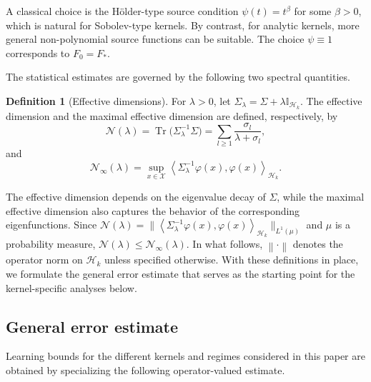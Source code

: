 \documentclass[11pt]{article}
\numberwithin{equation}{section}
\theoremstyle{plain}
\theoremstyle{definition}
\newtheorem{definition}[theorem]{Definition}
\theoremstyle{remark}
\newcommand{\X}{\mathcal{X}}
\newcommand{\Hs}{\mathcal{H}}
\newcommand{\I}{\mathbb{I}}
\newcommand{\norm}[1]{\left\lVert#1\right\rVert}
\newcommand{\innerpro}[1]{\left\langle#1\right\rangle}
\begin{document}
A classical choice is the Hölder-type source condition
$\psi(t)=t^{\beta}$ for some $\beta>0$, which is natural for Sobolev-type
kernels. By contrast, for analytic kernels, more general non-polynomial
source functions can be suitable. The choice $\psi\equiv1$
corresponds to $F_0=F_*$.

The statistical estimates are governed by the following two spectral
quantities.

\begin{definition}[Effective dimensions]
\label{def:effective_dimensions}
For $\lambda>0$, let
$\Sigma_\lambda=\Sigma+\lambda\I_{\Hs_k}$. The effective dimension and the
maximal effective dimension are defined, respectively, by
\begin{equation}
\label{eq:eff_dim_operator}
\mathcal{N}(\lambda)
=
\operatorname{Tr}\bigl(\Sigma_\lambda^{-1}\Sigma\bigr)
=
\sum_{l\geq1}\frac{\sigma_l}{\lambda+\sigma_l},
\end{equation}
and
\begin{equation}
\label{eq:max_eff_dim_operator}
\mathcal{N}_{\infty}(\lambda)
=
\sup_{x\in\X}
\innerpro{\Sigma_\lambda^{-1}\varphi(x),\varphi(x)}_{\Hs_k}.
\end{equation}
\end{definition}

The effective dimension depends on the eigenvalue decay of $\Sigma$, while the
maximal effective dimension also captures the behavior of the corresponding
eigenfunctions. Since $\mathcal{N}(\lambda)=\|\innerpro{\Sigma_\lambda^{-1}\varphi(x),\varphi(x)}_{\Hs_k}\|_{L^1(\mu)}$ and $\mu$ is a probability measure,
$\mathcal{N}(\lambda)\leq\mathcal{N}_{\infty}(\lambda)$.
In what follows, $\norm{\cdot}$ denotes the operator norm on $\Hs_k$ unless
specified otherwise.
With these definitions in place, we formulate the general error estimate that
serves as the starting point for the kernel-specific analyses below.

\subsection{General error estimate}

Learning bounds for the different kernels and regimes considered in this paper
are obtained by specializing the following operator-valued estimate.
\end{document}
